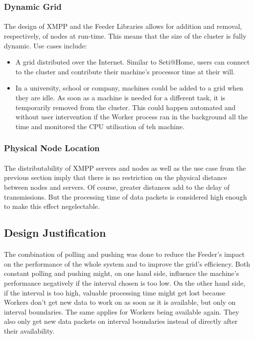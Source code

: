 \subsubsection{Dynamic Grid}
\paragraph{}
The design of XMPP and the Feeder Libraries allows for addition and removal, respectively, of nodes at run-time. This means that the size of the cluster is fully dynamic. Use cases include:
\begin{itemize}
\item A grid distributed over the Internet. Similar to Seti@Home, users can connect to the cluster and contribute their machine's processor time at their will.
\item In a university, school or company, machines could be added to a grid when they are idle. As soon as a machine is needed for a different task, it is temporarily removed from the cluster. This could happen automated and without user intervention if the Worker process ran in the background all the time and monitored the CPU utilisation of teh machine.
\end{itemize}

\subsubsection{Physical Node Location}
\paragraph{}
The distributability of XMPP servers and nodes as well as the use case from the previous section imply that there is no restriction on the physical distance between nodes and servers. Of course, greater distances add to the delay of transmissions. But the processing time of data packets is considered high enough to make this effect negelectable.

\subsection{Design Justification}
\paragraph{}
The combination of polling and pushing was done to reduce the Feeder's impact on the performance of the whole system and to improve the grid's efficiency. Both constant polling and pushing might, on one hand side, influence the machine's performance negatively if the interval chosen is too low. On the other hand side, if the interval is too high, valuable processing time might get lost because Workers don't get new data to work on as soon as it is available, but only on interval boundaries. The same applies for Workers being available again. They also only get new data packets on interval boundaries instead of directly after their availability.

